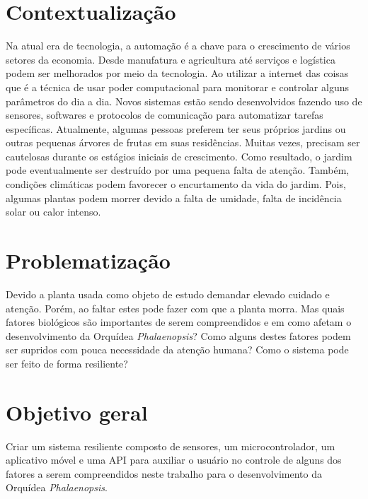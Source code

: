 \documentclass[conference]{IEEEtran}
\begin{document}
\section{Contextualização}

 Na atual era de tecnologia, a automação é a chave para o crescimento de vários setores da economia. Desde manufatura e agricultura até serviços e logística podem ser melhorados por meio da tecnologia. Ao utilizar a internet das coisas que é a técnica de usar poder computacional para monitorar e controlar alguns parâmetros do dia a dia. Novos sistemas estão sendo desenvolvidos fazendo uso de sensores, softwares e protocolos de comunicação para automatizar tarefas específicas. Atualmente, algumas pessoas preferem ter seus próprios jardins ou outras pequenas árvores de frutas em suas residências. Muitas vezes, precisam ser cautelosas durante os estágios iniciais de crescimento. Como resultado, o jardim pode eventualmente ser destruído por uma pequena falta de atenção. Também, condições climáticas podem favorecer o encurtamento da vida do jardim. Pois, algumas plantas podem morrer devido a falta de umidade, falta de incidência solar ou calor intenso.

\section{Problematização}
Devido a planta usada como objeto de estudo demandar elevado cuidado e atenção. Porém, ao faltar estes pode fazer com que a planta morra. Mas quais fatores biológicos  são importantes de serem compreendidos e em como afetam o desenvolvimento da Orquídea {\itshape{Phalaenopsis}}? Como  alguns destes fatores podem ser supridos com pouca necessidade da atenção humana? Como o sistema pode ser feito de forma resiliente?

\section{Objetivo geral}
Criar um sistema resiliente composto de sensores, um microcontrolador, um aplicativo móvel e uma API para auxiliar o usuário no controle de alguns dos fatores a serem compreendidos neste trabalho para o desenvolvimento da Orquídea {\itshape{Phalaenopsis}}.
\end{document}
